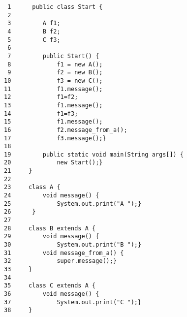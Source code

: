 \footnotesize
\begin{verbatim}
 1      public class Start {
 2     
 3         A f1;
 4         B f2;
 5         C f3;
 6     
 7         public Start() {
 8             f1 = new A();
 9             f2 = new B();
10             f3 = new C();
11             f1.message();
12             f1=f2;
13             f1.message();
14             f1=f3;
15             f1.message();
16             f2.message_from_a();
17             f3.message();}
18      
19         public static void main(String args[]) {
20             new Start();}
21     }
22      
23     class A {
24         void message() {
25             System.out.print("A ");}
26      }
27      
28     class B extends A {
29         void message() {
30             System.out.print("B ");}
31         void message_from_a() {
32             super.message();}
33     }
34     
35     class C extends A {
36         void message() {
37             System.out.print("C ");}
38     }
      \end{verbatim}
      \normalsize
